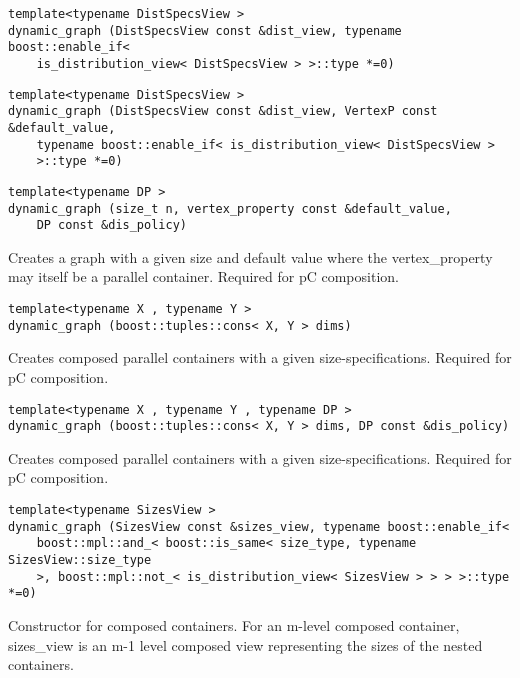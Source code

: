  
\begin{verbatim}
template<typename DistSpecsView >
dynamic_graph (DistSpecsView const &dist_view, typename boost::enable_if< 
    is_distribution_view< DistSpecsView > >::type *=0)
\end{verbatim}
 
\begin{verbatim}
template<typename DistSpecsView >
dynamic_graph (DistSpecsView const &dist_view, VertexP const &default_value, 
    typename boost::enable_if< is_distribution_view< DistSpecsView > 
    >::type *=0)
\end{verbatim}
 
\begin{verbatim}
template<typename DP >
dynamic_graph (size_t n, vertex_property const &default_value, 
    DP const &dis_policy)
\end{verbatim}

Creates a graph with a given size and default value where the vertex\_property may itself be a parallel container. Required for pC composition. 
 
\begin{verbatim}
template<typename X , typename Y >
dynamic_graph (boost::tuples::cons< X, Y > dims)
\end{verbatim}

Creates composed parallel containers with a given size-specifications. Required for pC composition. 
 
\begin{verbatim}
template<typename X , typename Y , typename DP >
dynamic_graph (boost::tuples::cons< X, Y > dims, DP const &dis_policy)
\end{verbatim}

Creates composed parallel containers with a given size-specifications. Required for pC composition. 
 
\begin{verbatim}
template<typename SizesView >
dynamic_graph (SizesView const &sizes_view, typename boost::enable_if< 
    boost::mpl::and_< boost::is_same< size_type, typename SizesView::size_type
    >, boost::mpl::not_< is_distribution_view< SizesView > > > >::type *=0)
\end{verbatim}

Constructor for composed containers. For an m-level composed container, sizes\_view is an m-1 level composed view representing the sizes of the nested containers. 


